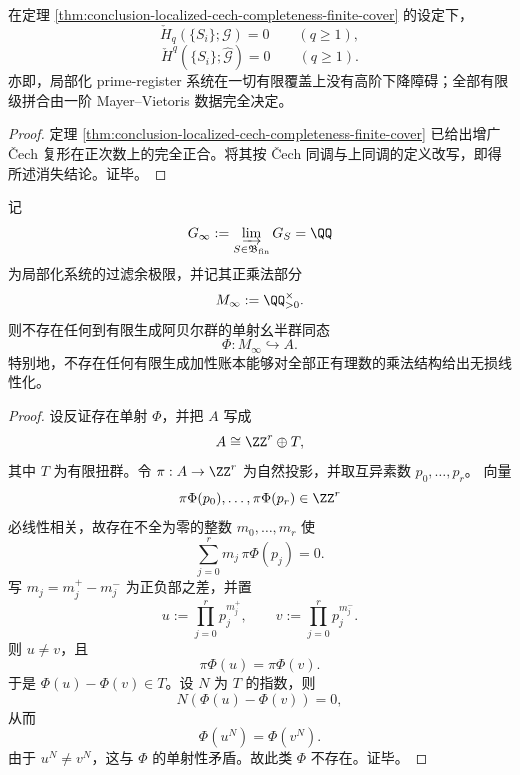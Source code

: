 \begin{corollary}\label{cor:conclusion-localized-no-high-cech-obstruction-finite-cover}
在定理 \ref{thm:conclusion-localized-cech-completeness-finite-cover} 的设定下，
\[
\check H_q(\{S_i\};\mathcal G)=0
\qquad (q\ge 1),
\]
\[
\check H^q(\{S_i\};\widehat{\mathcal G})=0
\qquad (q\ge 1).
\]
亦即，局部化 prime-register 系统在一切有限覆盖上没有高阶下降障碍；全部有限级拼合由一阶 Mayer--Vietoris 数据完全决定。
\end{corollary}

\begin{proof}
定理 \ref{thm:conclusion-localized-cech-completeness-finite-cover} 已给出增广 \v Cech 复形在正次数上的完全正合。将其按 \v Cech 同调与上同调的定义改写，即得所述消失结论。证毕。
\end{proof}

\begin{theorem}[过滤余极限上的有限账本线性化障碍]\label{thm:conclusion-localized-colimit-finite-ledger-linearization-obstruction}
记
\[
G_\infty:=\varinjlim_{S\in \mathfrak B_{\mathrm{fin}}} G_S=\QQ
\]
为局部化系统的过滤余极限，并记其正乘法部分
\[
M_\infty:=\QQ_{>0}^{\times}.
\]
则不存在任何到有限生成阿贝尔群的单射幺半群同态
\[
\Phi:M_\infty\hookrightarrow A.
\]
特别地，不存在任何有限生成加性账本能够对全部正有理数的乘法结构给出无损线性化。
\end{theorem}

\begin{proof}
设反证存在单射 \(\Phi\)，并把 \(A\) 写成
\[
A\cong \ZZ^r\oplus T,
\]
其中 \(T\) 为有限扭群。令 \(\pi:A\to \ZZ^r\) 为自然投影，并取互异素数 \(p_0,\dots,p_r\)。
向量
\[
\pi\Phi(p_0),\dots,\pi\Phi(p_r)\in \ZZ^r
\]
必线性相关，故存在不全为零的整数 \(m_0,\dots,m_r\) 使
\[
\sum_{j=0}^r m_j\,\pi\Phi(p_j)=0.
\]
写 \(m_j=m_j^+-m_j^-\) 为正负部之差，并置
\[
u:=\prod_{j=0}^r p_j^{m_j^+},
\qquad
v:=\prod_{j=0}^r p_j^{m_j^-}.
\]
则 \(u\neq v\)，且
\[
\pi\Phi(u)=\pi\Phi(v).
\]
于是 \(\Phi(u)-\Phi(v)\in T\)。设 \(N\) 为 \(T\) 的指数，则
\[
N(\Phi(u)-\Phi(v))=0,
\]
从而
\[
\Phi(u^N)=\Phi(v^N).
\]
由于 \(u^N\neq v^N\)，这与 \(\Phi\) 的单射性矛盾。故此类 \(\Phi\) 不存在。证毕。
\end{proof}


